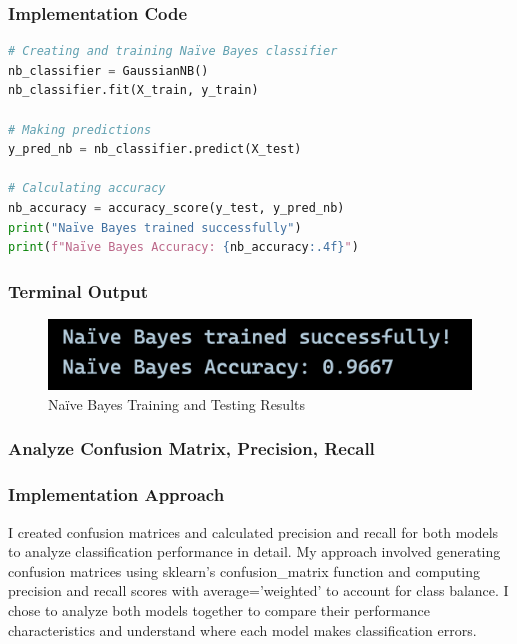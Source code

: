 \documentclass[12pt,a4paper]{article}
\begin{document}
\newpage
\subsubsection{Implementation Code}
\begin{lstlisting}[language=Python, caption=Use Naive Bayes to Classify Data]
# Creating and training Naïve Bayes classifier
nb_classifier = GaussianNB()
nb_classifier.fit(X_train, y_train)

# Making predictions
y_pred_nb = nb_classifier.predict(X_test)

# Calculating accuracy
nb_accuracy = accuracy_score(y_test, y_pred_nb)
print("Naïve Bayes trained successfully")
print(f"Naïve Bayes Accuracy: {nb_accuracy:.4f}")
\end{lstlisting}

\subsubsection{Terminal Output}

\begin{figure}[h!]
    \centering
    \includegraphics[width=\textwidth]{Figures/NBTrain.png}
    \caption{Na\"{i}ve Bayes Training and Testing Results}
\end{figure}

\subsubsection{Analyze Confusion Matrix, Precision, Recall}

\subsubsection{Implementation Approach}
I created confusion matrices and calculated precision and recall for both models to analyze classification performance in detail. My approach involved generating confusion matrices using sklearn's confusion\_matrix function and computing precision and recall scores with average='weighted' to account for class balance. I chose to analyze both models together to compare their performance characteristics and understand where each model makes classification errors.
\end{document}
